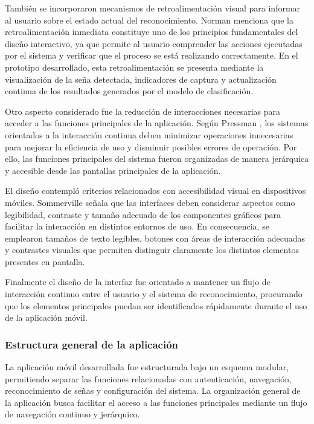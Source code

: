 	También se incorporaron mecanismos de retroalimentación visual para informar al
	usuario sobre el estado actual del reconocimiento. Norman
	\cite{norman2013design} menciona que la retroalimentación inmediata constituye uno
	de los principios fundamentales del diseño interactivo, ya que permite al usuario
	comprender las acciones ejecutadas por el sistema y verificar que el proceso se
	está realizando correctamente. En el prototipo desarrollado, esta retroalimentación
	se presenta mediante la visualización de la seña detectada, indicadores de captura
	y actualización continua de los resultados generados por el modelo de clasificación.
	
	Otro aspecto considerado fue la reducción de interacciones necesarias para acceder
	a las funciones principales de la aplicación. Según Pressman
	\cite{pressman2014software}, los sistemas orientados a la interacción continua
	deben minimizar operaciones innecesarias para mejorar la eficiencia de uso y
	disminuir posibles errores de operación. Por ello, las funciones principales del
	sistema fueron organizadas de manera jerárquica y accesible desde las pantallas
	principales de la aplicación.
	
	El diseño contempló criterios relacionados con accesibilidad visual
	en dispositivos móviles. Sommerville \cite{sommerville2016software} señala que las
	interfaces deben considerar aspectos como legibilidad, contraste y tamaño adecuado
	de los componentes gráficos para facilitar la interacción en distintos entornos de
	uso. En consecuencia, se emplearon tamaños de texto legibles, botones con áreas de
	interacción adecuadas y contrastes visuales que permiten distinguir claramente los
	distintos elementos presentes en pantalla.
	
	Finalmente el diseño de la interfaz fue orientado a mantener un flujo de
	interacción continuo entre el usuario y el sistema de reconocimiento, 
	procurando
	que los elementos principales puedan ser identificados rápidamente durante el uso
	de la aplicación móvil.
	
	
	\subsubsection{Estructura general de la aplicación}
	
	La aplicación móvil desarrollada fue estructurada bajo un esquema modular,
	permitiendo separar las funciones relacionadas con autenticación, navegación,
	reconocimiento de señas y configuración del sistema. La organización general de
	la aplicación busca facilitar el acceso a las funciones principales mediante un
	flujo de navegación continuo y jerárquico.
	
